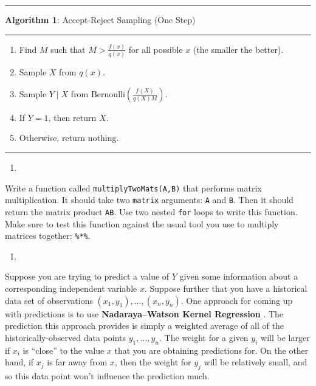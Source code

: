 \documentclass[
  12pt,
  krantz2]{krantz}
\providecommand{\tightlist}{%
  \setlength{\itemsep}{0pt}\setlength{\parskip}{0pt}}
\begin{document}
\begin{center}\rule{0.5\linewidth}{0.5pt}\end{center}

\textbf{Algorithm 1}: Accept-Reject Sampling (One Step)

\begin{center}\rule{0.5\linewidth}{0.5pt}\end{center}

\begin{enumerate}
\def\labelenumi{\arabic{enumi}.}
\tightlist
\item
  Find \(M\) such that \(M > \frac{f(x)}{q(x)}\) for all possible \(x\) (the smaller the better).
\item
  Sample \(X\) from \(q(x)\).
\item
  Sample \(Y \mid X\) from \(\text{Bernoulli}\left(\frac{f(X)}{q(X)M}\right)\).
\item
  If \(Y = 1\), then return \(X\).
\item
  Otherwise, return nothing.
\end{enumerate}

\begin{center}\rule{0.5\linewidth}{0.5pt}\end{center}

\begin{enumerate}
\def\labelenumi{\arabic{enumi}.}
\setcounter{enumi}{2}
\tightlist
\item
\end{enumerate}

Write a function called \texttt{multiplyTwoMats(A,B)} that performs matrix multiplication. It should take two \texttt{matrix} arguments: \texttt{A} and \texttt{B}. Then it should return the matrix product \texttt{AB}. Use two nested \texttt{for} loops to write this function. Make sure to test this function against the usual tool you use to multiply matrices together: \texttt{\%*\%}.

\begin{enumerate}
\def\labelenumi{\arabic{enumi}.}
\setcounter{enumi}{3}
\tightlist
\item
\end{enumerate}

Suppose you are trying to predict a value of \(Y\) given some information about a corresponding independent variable \(x\). Suppose further that you have a historical data set of observations \((x_1, y_1), \ldots, (x_n,y_n)\). One approach for coming up with predictions is to use \textbf{Nadaraya--Watson Kernel Regression} \citep{Nadaraya} \citep{Watson}. The prediction this approach provides is simply a weighted average of all of the historically-observed data points \(y_1, \ldots, y_n\). The weight for a given \(y_i\) will be larger if \(x_i\) is ``close'' to the value \(x\) that you are obtaining predictions for. On the other hand, if \(x_j\) is far away from \(x\), then the weight for \(y_j\) will be relatively small, and so this data point won't influence the prediction much.
\end{document}
